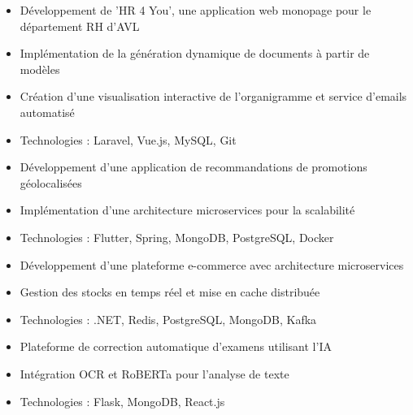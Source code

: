 \documentclass[10pt,a4paper,ragged2e,withhyper]{altacv}
\begin{document}
\begin{paracol}{2}




\begin{itemize}
\item Développement de 'HR 4 You', une application web monopage pour le département RH d'AVL
\item Implémentation de la génération dynamique de documents à partir de modèles
\item Création d'une visualisation interactive de l'organigramme et service d'emails automatisé
\item Technologies : Laravel, Vue.js, MySQL, Git
\end{itemize}


\begin{itemize}
\item Développement d'une application de recommandations de promotions géolocalisées
\item Implémentation d'une architecture microservices pour la scalabilité
\item Technologies : Flutter, Spring, MongoDB, PostgreSQL, Docker
\end{itemize}

\divider

\begin{itemize}
\item Développement d'une plateforme e-commerce avec architecture microservices
\item Gestion des stocks en temps réel et mise en cache distribuée
\item Technologies : .NET, Redis, PostgreSQL, MongoDB, Kafka
\end{itemize}

\divider

\begin{itemize}
\item Plateforme de correction automatique d'examens utilisant l'IA
\item Intégration OCR et RoBERTa pour l'analyse de texte
\item Technologies : Flask, MongoDB, React.js
\end{itemize}


\end{paracol}
\end{document}
